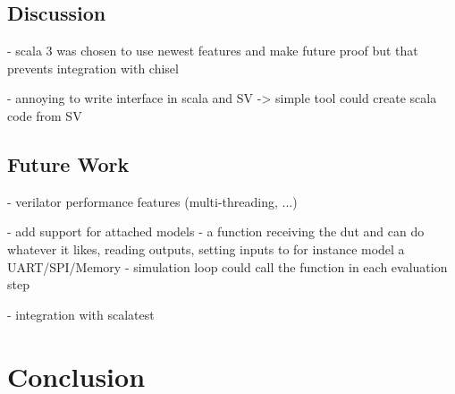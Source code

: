 \documentclass[12pt]{book}
\begin{document}
\section{Discussion} %

- scala 3 was chosen to use newest features and make future proof but that prevents integration with chisel

- annoying to write interface in scala and SV -> simple tool could create scala code from SV

\section{Future Work} %

- verilator performance features (multi-threading, ...)

- add support for attached models
  - a function receiving the dut and can do whatever it likes, reading outputs, setting inputs to for instance model a UART/SPI/Memory
  - simulation loop could call the function in each evaluation step

- integration with scalatest

\chapter{Conclusion} %

\printbibliography
\end{document}
